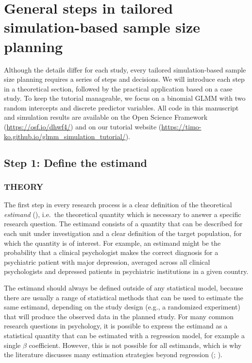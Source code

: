 \documentclass[
  man,
  floatsintext,
  longtable,
  a4paper,
  nolmodern,
  notxfonts,
  notimes,
  colorlinks=true,linkcolor=blue,citecolor=blue,urlcolor=blue]{apa7}
\begin{document}
\section{General steps in tailored simulation-based sample size
planning}\label{general-steps-in-tailored-simulation-based-sample-size-planning}

Although the details differ for each study, every tailored
simulation-based sample size planning requires a series of steps and
decisions. We will introduce each step in a theoretical section,
followed by the practical application based on a case study. To keep the
tutorial manageable, we focus on a binomial GLMM with two random
intercepts and discrete predictor variables. All code in this manuscript
and simulation results are available on the Open Science Framework
(\url{https://osf.io/dhwf4/}) and on our tutorial website
(\url{https://timo-ko.github.io/glmm_simulation_tutorial/}).

\subsection{Step 1: Define the
estimand}\label{step-1-define-the-estimand}

\subsubsection{THEORY}\label{theory}

The first step in every research process is a clear definition of the
theoretical \emph{estimand}
(),
i.e.~the theoretical quantity which is necessary to answer a specific
research question. The estimand consists of a quantity that can be
described for each unit under investigation and a clear definition of
the target population, for which the quantity is of interest. For
example, an estimand might be the probability that a clinical
psychologist makes the correct diagnosis for a psychiatric patient with
major depression, averaged across all clinical psychologists and
depressed patients in psychiatric institutions in a given country.

The estimand should always be defined outside of any statistical model,
because there are usually a range of statistical methods that can be
used to estimate the same estimand, depending on the study design (e.g.,
a randomized experiment) that will produce the observed data in the
planned study. For many common research questions in psychology, it is
possible to express the estimand as a statistical quantity that can be
estimated with a regression model, for example a single \(\beta\)
coefficient. However, this is not possible for all estimands, which is
why the literature discusses many estimation strategies beyond
regression
(; ).
\end{document}
